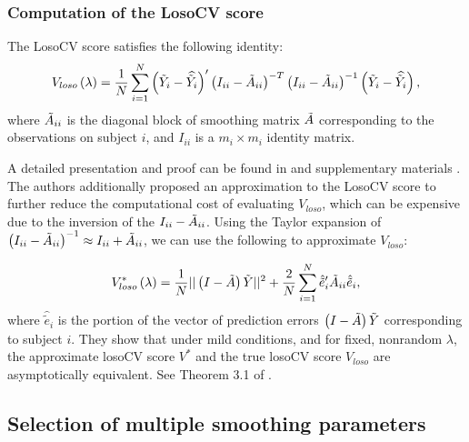   \subsubsection{Computation of the LosoCV score}
  
  \begin{lemma} \label{lemma:losocv-shortcut}
  The LosoCV score satisfies the following identity:
  \begin{equation*}
 V_{loso}\left( \lambda \right) = \frac{1}{N} \sum_{i = 1}^N \left(\tilde{Y}_i - \widehat{\tilde{Y}_i}\right)' \left(I_{ii} - \tilde{A}_{ii}\right)^{-T}\left(I_{ii} - \tilde{A}_{ii}\right)^{-1}\left(\tilde{Y}_i - \widehat{\tilde{Y}_i}\right),
  \end{equation*}
  \noindent
  where $\tilde{A}_{ii}$ is the diagonal block of smoothing matrix $\tilde{A}$ corresponding to the observations on subject $i$, and $I_{ii}$ is a $m_i \times m_i$ identity matrix.
\end{lemma}

A detailed presentation and proof can be found in \cite{xu2012asymptotic} and supplementary materials \cite{xuasymptotic}.  The authors additionally proposed an approximation to the LosoCV score to further reduce the computational cost of evaluating $V_{loso}$, which can be expensive due to the inversion of the $I_{ii} - \tilde{A}_{ii}$. Using the Taylor expansion of $\left(I_{ii} - \tilde{A}_{ii}\right)^{-1} \approx I_{ii} + \tilde{A}_{ii}$, we can use the following to approximate $V_{loso}$:

\begin{equation} \label{eq:approx-losocv}
V_{loso}^*\left( \lambda \right) = \frac{1}{N} \vert \vert \left(I - \tilde{A}\right)\tilde{Y} \vert \vert^2 + \frac{2}{N} \sum_{i = 1}^N \hat{\tilde{e}}'_{i}\tilde{A}_{ii}\hat{\tilde{e}}_i,
\end{equation}
\noindent
where $\hat{\tilde{e}}_i$ is the portion of the vector of prediction errors $\left(I - \tilde{A}\right)\tilde{Y}$ corresponding to subject $i$. They show that under mild conditions, and for fixed, nonrandom $\lambda$, the approximate losoCV score $V^*$ and the true losoCV score $V_{loso}$ are asymptotically equivalent. See Theorem 3.1 of \cite{xu2012asymptotic}.
  
\vspace{0.8in} 


\subsection{Selection of multiple smoothing parameters}


